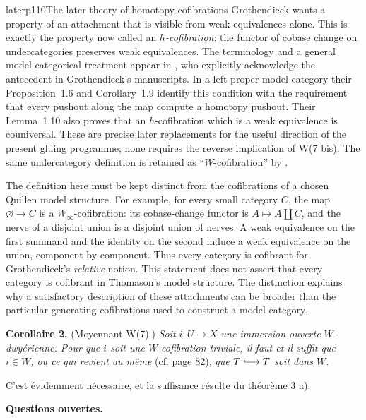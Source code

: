 \begin{dcomment}{later}{p110}{The later theory of homotopy cofibrations}
Grothendieck wants a property of an attachment that is visible from weak equivalences alone. This is exactly the property now called an \emph{$h$-cofibration}: the functor of cobase change on undercategories preserves weak equivalences. The terminology and a general model-categorical treatment appear in \citet[Definition~1.1]{BataninBerger2017}, who explicitly acknowledge the antecedent in Grothendieck's manuscripts. In a left proper model category their Proposition~1.6 and Corollary~1.9 identify this condition with the requirement that every pushout along the map compute a homotopy pushout. Their Lemma~1.10 also proves that an $h$-cofibration which is a weak equivalence is couniversal. These are precise later replacements for the useful direction of the present gluing programme; none requires the reverse implication of W(7 bis). The same undercategory definition is retained as ``$W$-cofibration'' by \citet[Definition~2.1 and Lemma~2.4]{ManettiMeazzini2019}.

The definition here must be kept distinct from the cofibrations of a chosen Quillen model structure. For example, for every small category $C$, the map $\varnothing\to C$ is a $W_\infty$-cofibration: its cobase-change functor is $A\mapsto A\amalg C$, and the nerve of a disjoint union is a disjoint union of nerves. A weak equivalence on the first summand and the identity on the second induce a weak equivalence on the union, component by component. Thus every category is cofibrant for Grothendieck's \emph{relative} notion. This statement does not assert that every category is cofibrant in Thomason's model structure. The distinction explains why a satisfactory description of these attachments can be broader than the particular generating cofibrations used to construct a model category.
\end{dcomment}


\textbf{Corollaire 2.} (Moyennant W(7).) \textit{Soit $i:U\longrightarrow X$ une immersion ouverte $W$-dwyérienne. Pour que $i$ soit une $W$-cofibration triviale, il faut et il suffit que $i\in W$, ou ce qui revient au même} (cf. page 82), \textit{que $\dot{T}\hra T$ soit dans $W$.}

C'est évidemment nécessaire, et la suffisance résulte du théorème 3 a).

\textbf{Questions ouvertes.}

